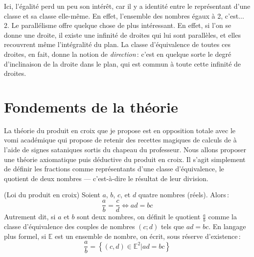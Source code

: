 		Ici, l'égalité perd un peu son intérêt, car il y a identité entre le représentant d'une classe et sa classe elle-même. En effet, l'ensemble des nombres égaux à 2, c'est... 2. Le parallélisme offre quelque chose de plus intéressant. En effet, si l'on se donne une droite, il existe une infinité de droites qui lui sont parallèles, et elles recouvrent même l'intégralité du plan. La classe d'équivalence de toutes ces droites, en fait, donne la notion de \emph{direction}\,: c'est en quelque sorte le degré d'inclinaison de la droite dans le plan, qui est commun à toute cette infinité de droites.



	\section{Fondements de la théorie}\label{sec_fond}
		La théorie du produit en croix que je propose est en opposition totale avec le vomi académique qui propose de retenir des recettes magiques de calculs de  à l'aide de signes sataniques sortis du chapeau du professeur. Nous allons proposer une théorie axiomatique puis déductive du produit en croix. Il s'agit simplement de définir les fractions comme représentants d'une classe d'équivalence, le quotient de deux nombres --- c'est-à-dire le résultat de leur division.
		\begin{axi} (Loi du produit en croix)
			Soient $a$, $b$, $c$, et $d$ quatre nombres (réels). Alors\,:
			\begin{equation}
				\boxed{\frac{a}{b}=\frac{c}{d} \Leftrightarrow ad=bc}
			\end{equation}
			Autrement dit, si $a$ et $b$ sont deux nombres, on définit le quotient $\frac{a}{b}$ comme la classe d'équivalence des couples de nombres $(c;d)$ tels que $ad=bc$. En langage plus formel, si $\mathbb{E}$ est un ensemble de nombre, on écrit, sous réserve d'existence\,:
			\begin{equation}
				\frac{a}{b}=\left\{ (c,d)\in\mathbb{E}^2|ad=bc\right\}			
			\end{equation}
		\end{axi}

